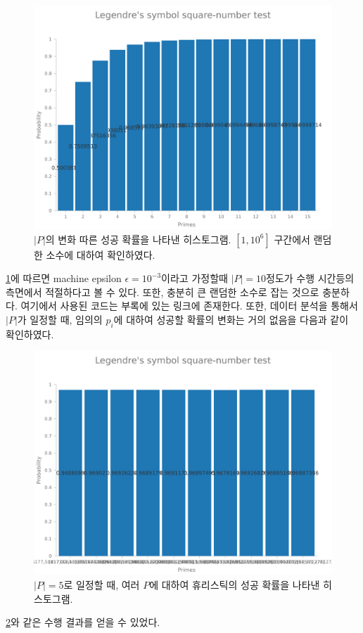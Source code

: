 \documentclass[a4paper]{article}
\begin{document}
        \begin{figure}[H]
            \centering
            \includegraphics[width=\textwidth]{legendre-test.png}
            \caption{$|P|$의 변화 따른 성공 확률을 나타낸 히스토그램. $[1,10^{6}]$ 구간에서 랜덤한 소수에 대하여 확인하였다.}
            \label{fig1}
        \end{figure}
        \cref{fig1}에 따르면 machine epsilon $\epsilon = 10^{-3}$이라고 가정할때 $|P|=10$정도가 수행 시간등의 측면에서 적절하다고 볼 수 있다.
        또한, 충분히 큰 랜덤한 소수로 잡는 것으로 충분하다.
        여기에서 사용된 코드는 부록에 있는 링크에 존재한다.
        또한, 데이터 분석을 통해서 $|P|$가 일정할 때, 임의의 $p_{i}$에 대하여 성공할 확률의 변화는 거의 없음을 다음과 같이 확인하였다.
        \begin{figure}[H]
            \centering
            \includegraphics[width=\textwidth]{legendre-test-p.png}
            \caption{$|P|=5$로 일정할 때, 여러 $P$에 대하여 휴리스틱의 성공 확률을 나타낸 히스토그램.}
            \label{fig2}
        \end{figure}
        \cref{fig2}와 같은 수행 결과를 얻을 수 있었다.
\end{document}
